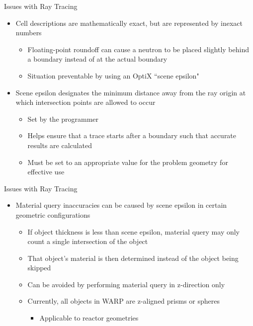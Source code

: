 \documentclass[xcolor=x11names,compress, handout]{beamer}
\renewcommand{\(}{\begin{columns}}
\renewcommand{\)}{\end{columns}}
\newcommand{\<}[1]{\begin{column}{#1}}
\renewcommand{\>}{\end{column}}
\begin{document}
\begin{frame}{Issues with Ray Tracing \cite{warp2015}}
	\begin{itemize}
	\pause
	\item{Cell descriptions are mathematically exact, but are represented by inexact numbers}
		\begin{itemize}
		\pause
		\item{Floating-point roundoff can cause a neutron to be placed slightly behind a boundary
		instead of at the actual boundary}
		\pause
		\item{Situation preventable by using an OptiX ``scene epsilon" }
		\end{itemize}
	\pause
	\item{Scene epsilon designates the minimum distance away from the ray origin at which 
	intersection points are allowed to occur}
		\begin{itemize}
		\pause
		\item{Set by the programmer}
		\pause
		\item{Helps ensure that a trace starts after a boundary such that accurate results are
		calculated}
		\pause
		\item{Must be set to an appropriate value for the problem geometry for effective use}
		\end{itemize}
	\end{itemize}
\end{frame}


\begin{frame}{Issues with Ray Tracing \cite{warp2015}}
	\begin{itemize}
	\pause
	\item{Material query inaccuracies can be caused by scene epsilon in certain geometric 
	configurations}
		\begin{itemize}
		\pause
		\item{If object thickness is less than scene epsilon, material query may only count a
		single intersection of the object}
		\pause
		\item{That object's material is then determined instead of the object being skipped}
		\pause
		\item{Can be avoided by performing material query in z-direction only}
		\pause
		\item{Currently, all objects in WARP are z-aligned prisms or spheres}
			\begin{itemize}
			\pause
			\item{Applicable to reactor geometries}
			\end{itemize}
		\end{itemize}
	\end{itemize}
\end{frame}
\end{document}
